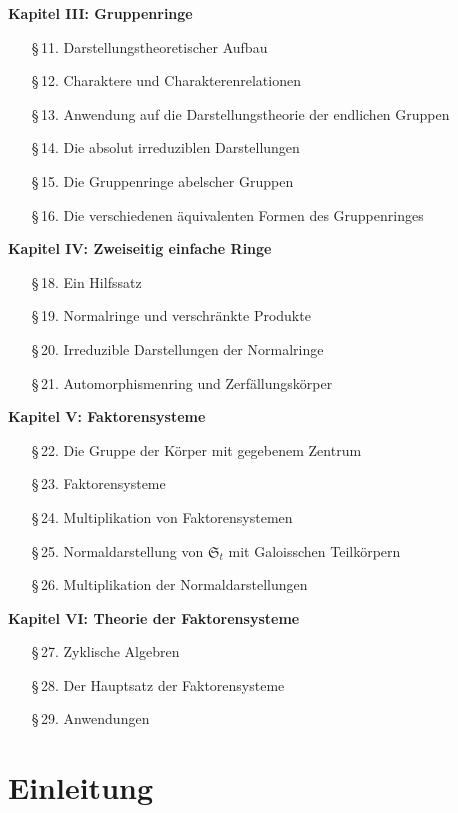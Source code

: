 \documentclass[10pt,a4paper]{article}
\theoremstyle{plain}
\theoremstyle{definition}
\theoremstyle{remark}
\begin{document}
\textbf{Kapitel III: Gruppenringe}
\begin{itemize}[nosep]
\item[\S\,11.] Darstellungstheoretischer Aufbau
\item[\S\,12.] Charaktere und Charakterenrelationen
\item[\S\,13.] Anwendung auf die Darstellungstheorie der endlichen Gruppen
\item[\S\,14.] Die absolut irreduziblen Darstellungen
\item[\S\,15.] Die Gruppenringe abelscher Gruppen
\item[\S\,16.] Die verschiedenen \"aquivalenten Formen des Gruppenringes
\end{itemize}

\textbf{Kapitel IV: Zweiseitig einfache Ringe}
\begin{itemize}[nosep]
\item[\S\,18.] Ein Hilfssatz
\item[\S\,19.] Normalringe und verschr\"ankte Produkte
\item[\S\,20.] Irreduzible Darstellungen der Normalringe
\item[\S\,21.] Automorphismenring und Zerf\"allungsk\"orper
\end{itemize}

\textbf{Kapitel V: Faktorensysteme}
\begin{itemize}[nosep]
\item[\S\,22.] Die Gruppe der K\"orper mit gegebenem Zentrum
\item[\S\,23.] Faktorensysteme
\item[\S\,24.] Multiplikation von Faktorensystemen
\item[\S\,25.] Normaldarstellung von $\mathfrak{S}_t$ mit Galoisschen Teilk\"orpern
\item[\S\,26.] Multiplikation der Normaldarstellungen
\end{itemize}

\textbf{Kapitel VI: Theorie der Faktorensysteme}
\begin{itemize}[nosep]
\item[\S\,27.] Zyklische Algebren
\item[\S\,28.] Der Hauptsatz der Faktorensysteme
\item[\S\,29.] Anwendungen
\end{itemize}

\newpage
\section*{Einleitung}
\end{document}
